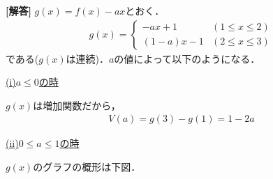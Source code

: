 \documentclass[../../main.tex]{subfiles}
\begin{document}
\begin{oframed}
  
\end{oframed}

{\bf [解答]} $g(x)=f(x)-ax$とおく．
\begin{align}
  g(x)=
  \begin{cases}
    -ax+1&(1\le x\le 2) \\
    (1-a)x-1&(2\le x\le3)
  \end{cases}
\end{align}
である($g(x)$は連続)．$a$の値によって以下のようになる．

\underline{(i)$a\le0$の時}

$g(x)$は増加関数だから，
\begin{align}
  V(a)=g(3)-g(1)=1-2a
\end{align}

\underline{(ii)$0\le a\le 1$の時}

$g(x)$のグラフの概形は下図．
\end{document}
